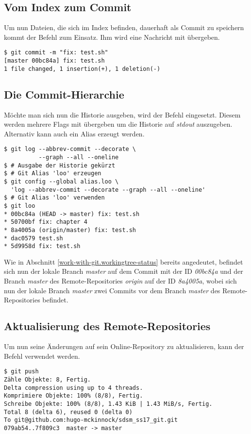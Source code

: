 \subsection{Vom Index zum Commit}
\label{work-with-git.index-to-commit}
Um nun Dateien, die sich im Index befinden, dauerhaft als Commit zu speichern kommt der Befehl \textit{} zum Einsatz. Ihm wird eine Nachricht mit übergeben.

\begin{verbatim}
$ git commit -m "fix: test.sh"
[master 00bc84a] fix: test.sh
1 file changed, 1 insertion(+), 1 deletion(-)
\end{verbatim}

\subsection{Die Commit-Hierarchie}
Möchte man sich nun die Historie ausgeben, wird der Befehl  \textit{} eingesetzt. Diesem werden mehrere Flags mit übergeben um die Historie auf \textit{stdout} auszugeben. Alternativ kann auch ein Alias erzeugt werden.

\begin{verbatim}
$ git log --abbrev-commit --decorate \
          --graph --all --oneline
$ # Ausgabe der Historie gekürzt
$ # Git Alias 'loo' erzeugen
$ git config --global alias.loo \ 
  'log --abbrev-commit --decorate --graph --all --oneline'
$ # Git Alias 'loo' verwenden
$ git loo
* 00bc84a (HEAD -> master) fix: test.sh
* 50700bf fix: chapter 4
* 8a4005a (origin/master) fix: test.sh
* dac0579 test.sh
* 5d9958d fix: test.sh
\end{verbatim}

Wie in Abschnitt \ref{work-with-git.workingtree-status} bereits angedeutet, befindet sich nun der lokale Branch \textit{master} auf dem Commit mit der ID \textit{00bc84a} und der Branch \textit{master} des Remote-Repositories \textit{origin} auf der ID \textit{8a4005a}, wobei sich nun der lokale Branch \textit{master} zwei Commits vor dem Branch \textit{master} des Remote-Repositories befindet.

\subsection{Aktualisierung des Remote-Repositories}
\label{work-with-git.update-online-repo}
Um nun seine Änderungen auf sein Online-Repository zu aktualisieren, kann der Befehl \textit{} verwendet werden. 

\begin{verbatim}
$ git push
Zähle Objekte: 8, Fertig.
Delta compression using up to 4 threads.
Komprimiere Objekte: 100% (8/8), Fertig.
Schreibe Objekte: 100% (8/8), 1.43 KiB | 1.43 MiB/s, Fertig.
Total 8 (delta 6), reused 0 (delta 0)
To git@github.com:hugo-mckinnock/sdsm_ss17_git.git
079ab54..7f809c3  master -> master
\end{verbatim}